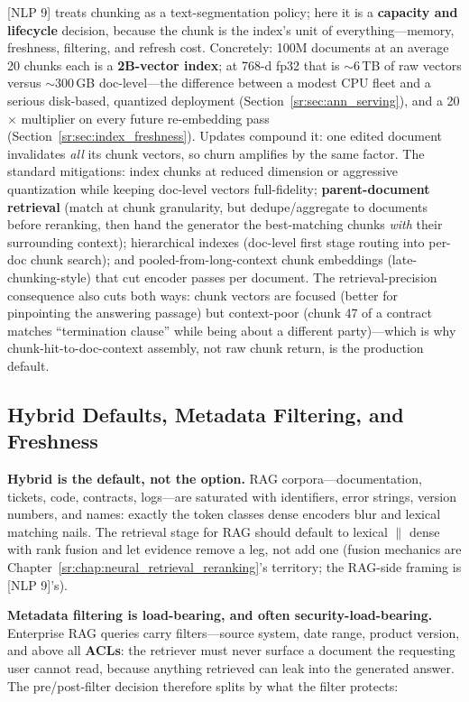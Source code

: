 [NLP 9] treats chunking as a text-segmentation policy; here it is a \textbf{capacity and lifecycle} decision, because the chunk is the index's unit of everything---memory, freshness, filtering, and refresh cost. Concretely: 100M documents at an average 20 chunks each is a \textbf{2B-vector index}; at 768-d fp32 that is $\sim$6\,TB of raw vectors versus $\sim$300\,GB doc-level---the difference between a modest CPU fleet and a serious disk-based, quantized deployment (Section~\ref{sr:sec:ann_serving}), and a 20$\times$ multiplier on every future re-embedding pass (Section~\ref{sr:sec:index_freshness}). Updates compound it: one edited document invalidates \textit{all} its chunk vectors, so churn amplifies by the same factor. The standard mitigations: index chunks at reduced dimension or aggressive quantization while keeping doc-level vectors full-fidelity; \textbf{parent-document retrieval} (match at chunk granularity, but dedupe/aggregate to documents before reranking, then hand the generator the best-matching chunks \textit{with} their surrounding context); hierarchical indexes (doc-level first stage routing into per-doc chunk search); and pooled-from-long-context chunk embeddings (late-chunking-style) that cut encoder passes per document. The retrieval-precision consequence also cuts both ways: chunk vectors are focused (better for pinpointing the answering passage) but context-poor (chunk 47 of a contract matches ``termination clause'' while being about a different party)---which is why chunk-hit-to-doc-context assembly, not raw chunk return, is the production default.

\subsection{Hybrid Defaults, Metadata Filtering, and Freshness}

\textbf{Hybrid is the default, not the option.} RAG corpora---documentation, tickets, code, contracts, logs---are saturated with identifiers, error strings, version numbers, and names: exactly the token classes dense encoders blur and lexical matching nails. The retrieval stage for RAG should default to lexical $\parallel$ dense with rank fusion and let evidence remove a leg, not add one (fusion mechanics are Chapter~\ref{sr:chap:neural_retrieval_reranking}'s territory; the RAG-side framing is [NLP 9]'s).

\textbf{Metadata filtering is load-bearing, and often security-load-bearing.} Enterprise RAG queries carry filters---source system, date range, product version, and above all \textbf{ACLs}: the retriever must never surface a document the requesting user cannot read, because anything retrieved can leak into the generated answer. The pre/post-filter decision therefore splits by what the filter protects:

